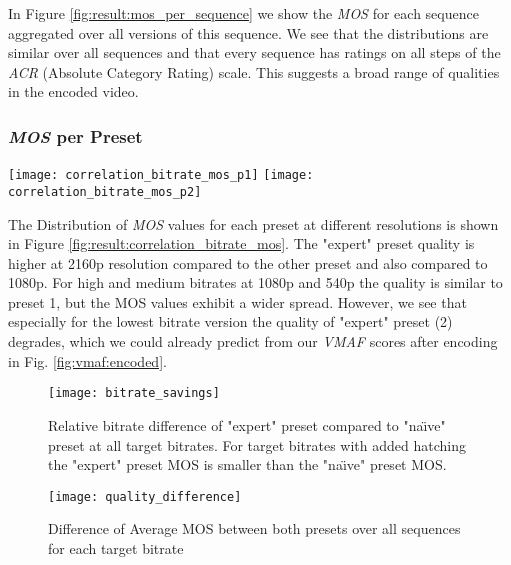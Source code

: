 In Figure \ref{fig:result:mos_per_sequence} we show the \textit{MOS} for each sequence aggregated over all versions of this sequence. We see that the distributions are similar over all sequences and that every sequence has ratings on all steps of the \textit{ACR} (Absolute Category Rating) scale. This suggests a broad range of qualities in the encoded video.




\subsubsection{\textit{MOS} per Preset}
\begin{figure*}[htb!]
	\centering
	\texttt{[image: correlation\_bitrate\_mos\_p1]}
	\texttt{[image: correlation\_bitrate\_mos\_p2]}
	\caption{\textit{MOS} for both encoding presets. The center line represents a median and the outer line the 25th and 75th percentile of \textit{MOS} for the 6 sequences. The scatter points are the MOS of the individual videos.}
	\label{fig:result:correlation_bitrate_mos}
\end{figure*}

The Distribution of \textit{MOS} values for each preset at different resolutions is shown in Figure \ref{fig:result:correlation_bitrate_mos}.
The "expert" preset quality is higher at 2160p resolution compared to the other preset and also compared to 1080p. For high and medium bitrates at 1080p and 540p the quality is similar to preset 1, but the MOS values exhibit a wider spread.
However, we see that especially for the lowest bitrate version the quality of "expert" preset (2) degrades, which we could already predict from our \textit{VMAF} scores after encoding in Fig. \ref{fig:vmaf:encoded}.

\begin{figure}[htb!]
	\centering
	\texttt{[image: bitrate\_savings]}
	\caption{Relative bitrate difference of "expert" preset compared to "na\"{\i}ve" preset at all target bitrates. For target bitrates with added hatching the "expert" preset MOS is smaller than the "na\"{\i}ve" preset MOS.}
	\label{fig:result:bitrate_savings}
\end{figure}
\begin{figure}[htb!]
	\centering
	\texttt{[image: quality\_difference]}
	\caption{Difference of Average MOS between both presets over all sequences for each target bitrate}
	\label{fig:result:quality_difference}
\end{figure}

